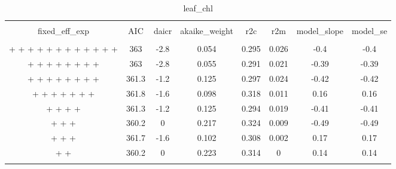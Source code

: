 
\begin{table}[!htbp] \centering 
  \caption{leaf_chl} 
  \label{leaf_chl} 
\begin{tabular}{@{\extracolsep{5pt}} cccccccc} 
\\[-1.8ex]\hline 
\hline \\[-1.8ex] 
fixed\_eff\_exp & AIC & daicr & akaike\_weight & r2c & r2m & model\_slope & model\_se \\ 
\hline \\[-1.8ex] 
 +  +  +  +  +  +  +  +  +  +  +  +  & 363 & -2.8 & 0.054 & 0.295 & 0.026 & -0.4 & -0.4 \\ 
 +  +  +  +  +  +  +  +  & 363 & -2.8 & 0.055 & 0.291 & 0.021 & -0.39 & -0.39 \\ 
 +  +  +  +  +  +  +  +  & 361.3 & -1.2 & 0.125 & 0.297 & 0.024 & -0.42 & -0.42 \\ 
 +  +  +  +  +  +  +  & 361.8 & -1.6 & 0.098 & 0.318 & 0.011 & 0.16 & 0.16 \\ 
 +  +  +  +  & 361.3 & -1.2 & 0.125 & 0.294 & 0.019 & -0.41 & -0.41 \\ 
 +  +  +  & 360.2 & 0 & 0.217 & 0.324 & 0.009 & -0.49 & -0.49 \\ 
 +  +  +  & 361.7 & -1.6 & 0.102 & 0.308 & 0.002 & 0.17 & 0.17 \\ 
 +  +  & 360.2 & 0 & 0.223 & 0.314 & 0 & 0.14 & 0.14 \\ 
\hline \\[-1.8ex] 
\end{tabular} 
\end{table} 
